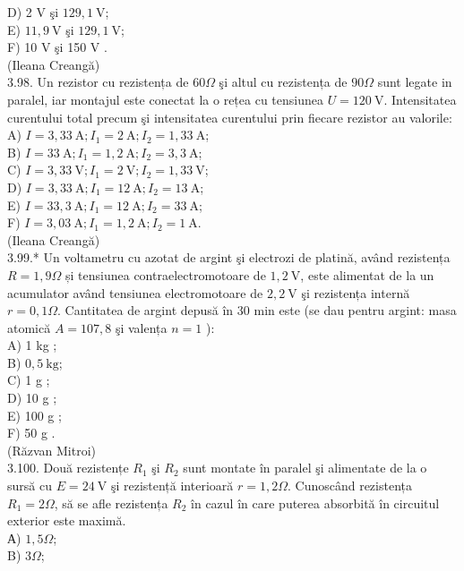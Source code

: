 \documentclass[10pt]{article}
\begin{document}
D) 2 V şi $129,1 \mathrm{~V}$;\\
E) $11,9 \mathrm{~V}$ şi $129,1 \mathrm{~V}$;\\
F) 10 V şi 150 V .\\
(Ileana Creangă)\\
3.98. Un rezistor cu rezistența de $60 \Omega$ şi altul cu rezistența de $90 \Omega$ sunt legate in paralel, iar montajul este conectat la o rețea cu tensiunea $U=120 \mathrm{~V}$. Intensitatea curentului total precum şi intensitatea curentului prin fiecare rezistor au valorile:\\
A) $I=3,33 \mathrm{~A} ; I_{1}=2 \mathrm{~A} ; I_{2}=1,33 \mathrm{~A}$;\\
B) $I=33 \mathrm{~A} ; I_{1}=1,2 \mathrm{~A} ; I_{2}=3,3 \mathrm{~A}$;\\
C) $I=3,33 \mathrm{~V} ; I_{1}=2 \mathrm{~V} ; I_{2}=1,33 \mathrm{~V}$;\\
D) $I=3,33 \mathrm{~A} ; I_{1}=12 \mathrm{~A} ; I_{2}=13 \mathrm{~A}$;\\
E) $I=33,3 \mathrm{~A} ; I_{1}=12 \mathrm{~A} ; I_{2}=33 \mathrm{~A}$;\\
F) $I=3,03 \mathrm{~A} ; I_{1}=1,2 \mathrm{~A} ; I_{2}=1 \mathrm{~A}$.\\
(Ileana Creangă)\\
3.99.* Un voltametru cu azotat de argint şi electrozi de platină, având rezistența $R=1,9 \Omega$ și tensiunea contraelectromotoare de $1,2 \mathrm{~V}$, este alimentat de la un acumulator având tensiunea electromotoare de $2,2 \mathrm{~V}$ şi rezistența internă $r=0,1 \Omega$. Cantitatea de argint depusă în 30 min este (se dau pentru argint: masa atomică $A=107,8$ şi valența $n=1$ ):\\
A) 1 kg ;\\
B) $0,5 \mathrm{~kg}$;\\
C) 1 g ;\\
D) 10 g ;\\
E) 100 g ;\\
F) 50 g .\\
(Răzvan Mitroi)\\
3.100. Două rezistențe $R_{1}$ şi $R_{2}$ sunt montate în paralel şi alimentate de la o sursă cu $E=24 \mathrm{~V}$ şi rezistență interioară $r=1,2 \Omega$. Cunoscând rezistența $R_{1}=2 \Omega$, să se afle rezistența $R_{2}$ în cazul în care puterea absorbită în circuitul exterior este maximă.\\
А) $1,5 \Omega$;\\
B) $3 \Omega$;\\
\end{document}
